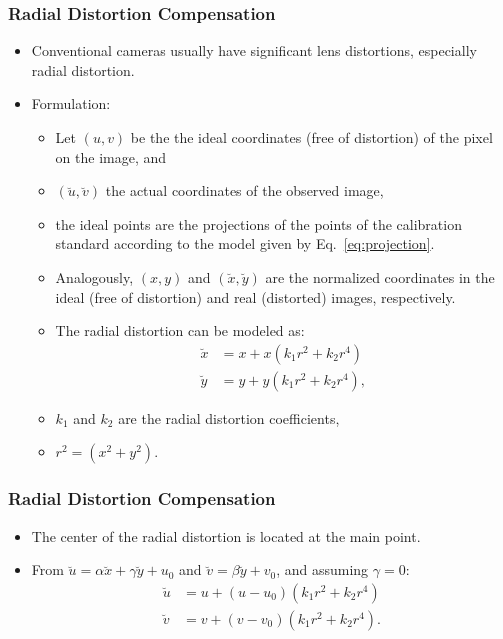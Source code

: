 \documentclass{beamer}
\begin{document}
		\begin{frame}\frametitle{Radial Distortion Compensation}
			\begin{itemize}
			 \item Conventional cameras usually have significant lens distortions, especially radial distortion.
			 \item Formulation:
			 \begin{itemize}
			  \item Let $(u,v)$ be the the ideal coordinates (free of distortion) of the pixel on the image, and
			  \item $(\breve{u},\breve{v})$ the actual coordinates of the observed image,
			  \item the ideal points are the projections of the points of the calibration standard according to the model given by Eq.~\eqref{eq:projection}.
			  \item Analogously, $(x,y)$ and $(\breve{x},\breve{y})$ are the normalized coordinates in the ideal (free of distortion) and real (distorted) images, respectively.
			  \item The radial distortion can be modeled as:
			\begin{align}
			\breve{x} &= x + x(k_1 r^2 + k_2 r^4) \\%
			\breve{y} &= y + y(k_1 r^2 + k_2 r^4), %
			\end{align}
			\item $k_1$ and $k_2$ are the radial distortion coefficients,
			\item $r^2 = (x^2 + y^2)$.
			 \end{itemize}
			\end{itemize}
		\end{frame}


		\begin{frame}
			\frametitle{Radial Distortion Compensation}
			\begin{itemize}
			 \item The center of the radial distortion is located at the main point.
			 \item From $\breve{u} = \alpha \breve{x} + \gamma \breve{y} + u_0 $ and $\breve{v} = \beta \breve{y} + v_0$, and assuming $\gamma = 0$:
			  \begin{align}
			    \label{eq:u_dist}
			    \breve{u} &= u + (u-u_0)(k_1 r^2 + k_2 r^4 ) \\
			    \label{eq:v_dist}
			    \breve{v} &= v + (v-v_0)(k_1 r^2 + k_2 r^4 ).
			  \end{align}
			\end{itemize}
		\end{frame}
\end{document}
